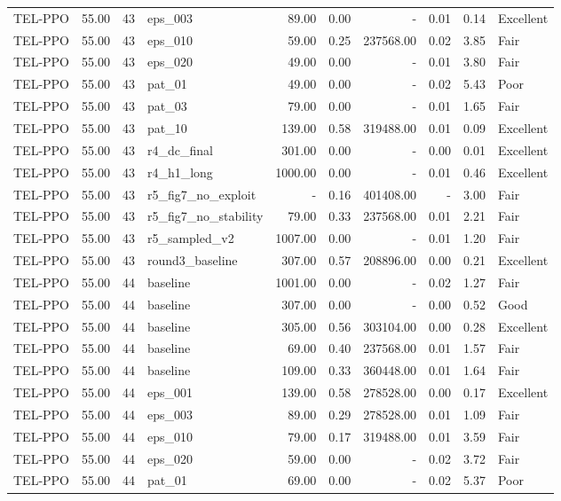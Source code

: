\begin{table}[htbp]
\begin{tabular}{lrrlrrrrrl}
TEL-PPO & 55.00 & 43 & eps_003 & 89.00 & 0.00 & - & 0.01 & 0.14 & Excellent \\
TEL-PPO & 55.00 & 43 & eps_010 & 59.00 & 0.25 & 237568.00 & 0.02 & 3.85 & Fair \\
TEL-PPO & 55.00 & 43 & eps_020 & 49.00 & 0.00 & - & 0.01 & 3.80 & Fair \\
TEL-PPO & 55.00 & 43 & pat_01 & 49.00 & 0.00 & - & 0.02 & 5.43 & Poor \\
TEL-PPO & 55.00 & 43 & pat_03 & 79.00 & 0.00 & - & 0.01 & 1.65 & Fair \\
TEL-PPO & 55.00 & 43 & pat_10 & 139.00 & 0.58 & 319488.00 & 0.01 & 0.09 & Excellent \\
TEL-PPO & 55.00 & 43 & r4_dc_final & 301.00 & 0.00 & - & 0.00 & 0.01 & Excellent \\
TEL-PPO & 55.00 & 43 & r4_h1_long & 1000.00 & 0.00 & - & 0.01 & 0.46 & Excellent \\
TEL-PPO & 55.00 & 43 & r5_fig7_no_exploit & - & 0.16 & 401408.00 & - & 3.00 & Fair \\
TEL-PPO & 55.00 & 43 & r5_fig7_no_stability & 79.00 & 0.33 & 237568.00 & 0.01 & 2.21 & Fair \\
TEL-PPO & 55.00 & 43 & r5_sampled_v2 & 1007.00 & 0.00 & - & 0.01 & 1.20 & Fair \\
TEL-PPO & 55.00 & 43 & round3_baseline & 307.00 & 0.57 & 208896.00 & 0.00 & 0.21 & Excellent \\
TEL-PPO & 55.00 & 44 & baseline & 1001.00 & 0.00 & - & 0.02 & 1.27 & Fair \\
TEL-PPO & 55.00 & 44 & baseline & 307.00 & 0.00 & - & 0.00 & 0.52 & Good \\
TEL-PPO & 55.00 & 44 & baseline & 305.00 & 0.56 & 303104.00 & 0.00 & 0.28 & Excellent \\
TEL-PPO & 55.00 & 44 & baseline & 69.00 & 0.40 & 237568.00 & 0.01 & 1.57 & Fair \\
TEL-PPO & 55.00 & 44 & baseline & 109.00 & 0.33 & 360448.00 & 0.01 & 1.64 & Fair \\
TEL-PPO & 55.00 & 44 & eps_001 & 139.00 & 0.58 & 278528.00 & 0.00 & 0.17 & Excellent \\
TEL-PPO & 55.00 & 44 & eps_003 & 89.00 & 0.29 & 278528.00 & 0.01 & 1.09 & Fair \\
TEL-PPO & 55.00 & 44 & eps_010 & 79.00 & 0.17 & 319488.00 & 0.01 & 3.59 & Fair \\
TEL-PPO & 55.00 & 44 & eps_020 & 59.00 & 0.00 & - & 0.02 & 3.72 & Fair \\
TEL-PPO & 55.00 & 44 & pat_01 & 69.00 & 0.00 & - & 0.02 & 5.37 & Poor \\

\end{tabular}
\end{table}
